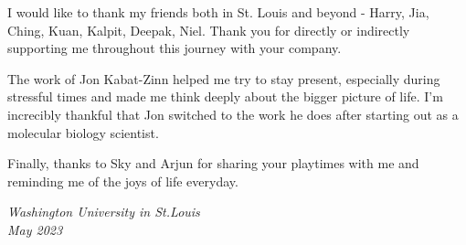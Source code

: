 I would like to thank my friends both in St. Louis and beyond - Harry, Jia, Ching, Kuan, Kalpit, Deepak, Niel. Thank you for directly or indirectly supporting me throughout this journey with your company.

The work of Jon Kabat-Zinn helped me try to stay present, especially during stressful times and made me think deeply about the bigger picture of life. I'm increcibly thankful that Jon switched to the work he does after starting out as a molecular biology scientist.

Finally, thanks to Sky and Arjun for sharing your playtimes with me and reminding me of the joys of life everyday.

\null\hfill \thesisauthor

\noindent
\textit{Washington University in St.\@ Louis}\\
\textit{May 2023}
